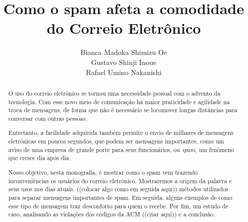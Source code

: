 \documentclass[a4paper,dvipdfm]{article}
\title{Como o spam afeta a comodidade do Correio Eletrônico}
\author{Bianca Madoka Shimizu Oe\\
		Gustavo Shinji Inoue\\
		Rafael Umino Nakanishi}
\begin{document}
\maketitle

\begin{abstract}
	O uso do correio eletrônico se tornou uma necessidade pessoal com o advento da tecnologia. Com esse novo meio de comunicação há maior praticidade e agilidade na troca de mensagens, de forma que não é necessário se locomover longas distâncias para conversar com outras pessoas.

	Entretanto, a facilidade adquirida também permite o envio de milhares de mensagens eletrônicas em poucos segundos, que podem ser mensagens importantes, como um aviso de uma empresa de grande porte para seus funcionários, ou \emph{spam}, um fenômeno que cresce dia após dia.

	Nosso objetivo, nesta monografia, é mostrar como o spam vem trazendo inconveniências os usuários do correio eletrônico.
	Mostraremos a origem da palavra e seus usos nos dias atuais. 
	((colocar algo como em seguida aqui)) métodos utilizados para separar mensagens importantes de spam.
	Em seguida, alguns exemplos de como esse tipo de mensagem traz desconforto para quem o recebe. 
	Por fim, um estudo de caso, analisando as violações dos códigos da ACM ((citar aqui)) e a conclusão.
\end{abstract}

\newpage

\tableofcontents
\newpage

\printglossaries
{}
\end{document}

